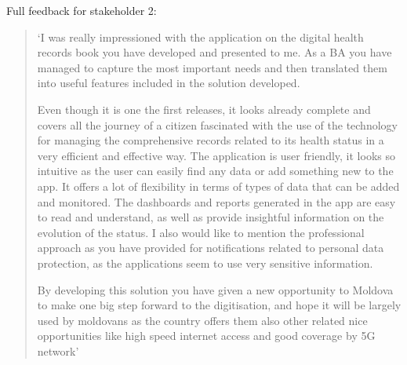 Full feedback for stakeholder 2:

\begin{quotation}
`I was really impressioned with the application on the digital health records book you have developed and presented to me. As a BA you have managed to capture the most important needs and then translated them into useful features included in the solution developed.

Even though it is one the first releases, it looks already complete and covers all the journey of a citizen fascinated with the use of the technology for managing the comprehensive records related to its health status in a very efficient and effective way. The application is user friendly, it looks so intuitive as the user can easily find any data or add something new to the app. It offers a lot of flexibility in terms of types of data that can be added and monitored. The dashboards and reports generated in the app are easy to read and understand, as well as provide insightful information on the evolution of the status. I also would like to mention the professional approach as you have provided for notifications related to personal data protection, as the applications seem to use very sensitive information.

By developing this solution you have given a new opportunity to Moldova to make one big step forward to the digitisation, and hope it will be largely used by moldovans as the country offers them also other related nice opportunities like high speed internet access and good coverage by 5G network'
\end{quotation}